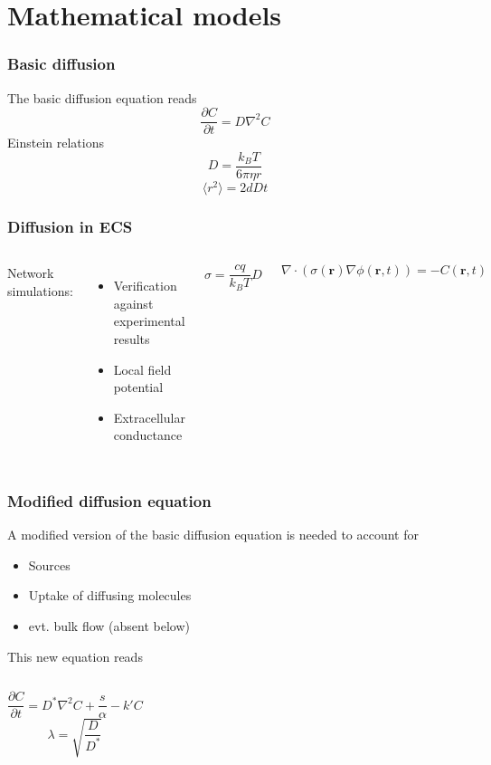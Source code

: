 \documentclass{beamer}
\renewcommand{\d}{\partial}
\begin{document}
\section{Mathematical models}

\begin{frame}
 \frametitle{Basic diffusion}
 The basic diffusion equation reads
 \begin{equation}
  \frac{\d C}{\d t} = D\nabla^2C
 \end{equation}
Einstein relations
\begin{equation}
 D = \frac{k_B T}{6\pi\eta r}
\end{equation}
\begin{equation}
 \langle r^2\rangle = 2dDt
\end{equation}
\end{frame}

\begin{frame}
 \frametitle{Diffusion in ECS}
\begin{columns} 
 \column{2.0in} 
 Network simulations: \\
 \begin{itemize}
  \item Verification against experimental results
  \item Local field potential
  \item Extracellular conductance
 \end{itemize}
 \begin{equation}
  \sigma = \frac{cq}{k_B T}D 
 \end{equation}
 
\column{2.0in}
\begin{equation*}
\nabla\cdot(\sigma(\mathbf{r})\nabla\phi(\mathbf{r},t)) = -C(\mathbf{r},t)
\end{equation*}

\end{columns}

\end{frame}

\begin{frame}
 \frametitle{Modified diffusion equation}
 A modified version of the basic diffusion equation is needed to account for 
 \begin{itemize}
  \item Sources
  \item Uptake of diffusing molecules
  \item evt. bulk flow (absent below)
 \end{itemize}
This new equation reads
\begin{columns}
\column{2.0in}
\begin{equation}
   \frac{\d C}{\d t} = D^*\nabla^2C +\frac{s}{\alpha} -k'C
\end{equation}
\column{2.0in}
\begin{equation}
 \lambda = \sqrt{\frac{D}{D^*}}
\end{equation}

\end{columns}
 \end{frame}
\end{document}
